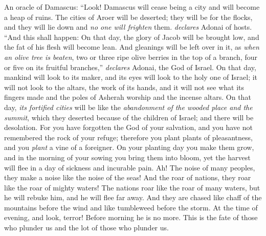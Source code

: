 \begin{biblechapter} %
 An oracle of Damascus:
\verse “Look! Damascus will cease being a city 
and will become a heap of ruins.
\verse The cities of Aroer will be deserted; 
they will be for the flocks, 
and they will lie down and \textit{no one will frighten} them. \textit{declares} Adonai of hosts.
\verse “And this shall happen:
\verse On that day, the glory of Jacob will be brought low, 
and the fat of his flesh will become lean.
\verse And gleanings will be left over in it, as \textit{when an olive tree is beaten}, two or three ripe olive berries in the top of a branch, 
four or five on its fruitful branches,” \textit{declares} Adonai, the God of Israel.
\verse On that day, mankind will look to its maker, 
and its eyes will look to the holy one of Israel;
\verse it will not look to the altars, 
the work of its hands, 
and it will not see what its fingers made 
and the poles of Asherah worship and the incense altars.
\verse On that day, \textit{its fortified cities} will be like the \textit{abandonment of the wooded place and the summit}, which they deserted because of the children of Israel; and there will be desolation.
\verse For you have forgotten the God of your salvation, 
and you have not remembered the rock of your refuge; 
therefore you plant plants of pleasantness, 
and you \textit{plant} a vine of a foreigner.
\verse On your planting day you make them grow, 
and in the morning of your sowing you bring them into bloom, 
yet the harvest will flee in a day of sickness and incurable pain.
 Ah! The noise of many peoples, they make a noise like the noise of the seas! 
And the roar of nations, they roar like the roar of mighty waters!
\verse The nations roar like the roar of many waters, 
but he will rebuke him, and he will flee far away. 
And they are chased like chaff of the mountains before the wind 
and like tumbleweed before the storm.
\verse At the time of evening, and look, terror! 
Before morning he is no more. 
This is the fate of those who plunder us 
and the lot of those who plunder us.
\end{biblechapter}


